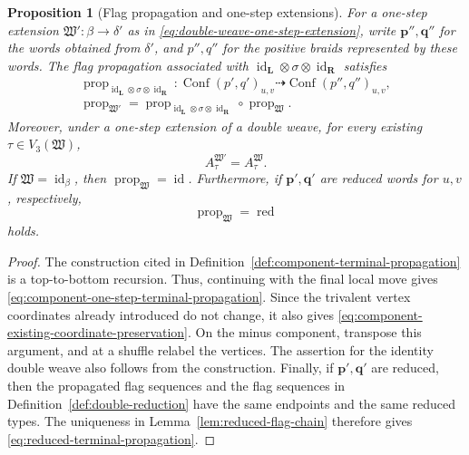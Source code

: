 \documentclass[10pt,a4paper]{article}
\newtheorem{proposition}[theorem]{Proposition}
\theoremstyle{definition}
\theoremstyle{remark}
\newcommand{\Conf}{\operatorname{Conf}}
\newcommand{\fW}{\mathfrak W}
\newcommand{\id}{\operatorname{id}}
\begin{document}
\begin{proposition}[Flag propagation and one-step extensions]
\label{prop:component-terminal-propagation}
For a one-step extension \(\fW':\beta\to\delta'\) as in
\eqref{eq:double-weave-one-step-extension}, write
\(\mathbf p'',\mathbf q''\) for the words obtained from \(\delta'\), and
\(p'',q''\) for the positive braids represented by these words.  The flag
propagation associated with
\(\id_{\mathbf L}\otimes\sigma\otimes\id_{\mathbf R}\) satisfies
\begin{equation}
 \begin{gathered}
  \operatorname{prop}_{
   \id_{\mathbf L}\otimes\sigma\otimes\id_{\mathbf R}}:
  \Conf(p',q')_{u,v}
  \dashrightarrow
  \Conf(p'',q'')_{u,v},\\
  \operatorname{prop}_{\fW'}
  =\operatorname{prop}_{
    \id_{\mathbf L}\otimes\sigma\otimes\id_{\mathbf R}}
   \circ\operatorname{prop}_{\fW}.
 \end{gathered}
 \label{eq:component-one-step-terminal-propagation}
\end{equation}
Moreover, under a one-step extension of a double weave, for every existing
\(\tau\in V_3(\fW)\),
\begin{equation}
 A_\tau^{\fW'}=A_\tau^\fW.
 \label{eq:component-existing-coordinate-preservation}
\end{equation}
If \(\fW=\id_\beta\), then \(\operatorname{prop}_{\fW}=\id\).  Furthermore,
if \(\mathbf p',\mathbf q'\) are reduced words for \(u,v\), respectively,
\begin{equation}
 \operatorname{prop}_{\fW}
 =\operatorname{red}
 \label{eq:reduced-terminal-propagation}
\end{equation}
holds.
\end{proposition}

\begin{proof}
The construction cited in Definition~\ref{def:component-terminal-propagation}
is a top-to-bottom recursion.  Thus, continuing with the final local move gives
\eqref{eq:component-one-step-terminal-propagation}.  Since the trivalent
vertex coordinates already introduced do not change, it also gives
\eqref{eq:component-existing-coordinate-preservation}.  On the minus
component, transpose this argument, and at a shuffle relabel the vertices.  The
assertion for the identity double weave also follows from the construction.
Finally, if \(\mathbf p',\mathbf q'\) are reduced, then the propagated flag
sequences and the flag sequences in Definition~\ref{def:double-reduction} have
the same endpoints and the same reduced types.  The uniqueness in
Lemma~\ref{lem:reduced-flag-chain} therefore gives
\eqref{eq:reduced-terminal-propagation}.
\end{proof}
\end{document}
